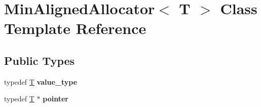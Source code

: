 \hypertarget{class_min_aligned_allocator}{}\section{Min\+Aligned\+Allocator$<$ T $>$ Class Template Reference}
\label{class_min_aligned_allocator}
\subsection*{Public Types}
\begin{DoxyCompactItemize}
\item 
\mbox{\label{class_min_aligned_allocator_a3651605a06149d16e9feb03f70ad61df}} 
typedef \mbox{\hyperlink{struct_t}{T}} {\bfseries value\+\_\+type}
\item 
\mbox{\label{class_min_aligned_allocator_ab25b391fee8a843d10363f3380537171}} 
typedef \mbox{\hyperlink{struct_t}{T}} $\ast$ {\bfseries pointer}
\end{DoxyCompactItemize}
